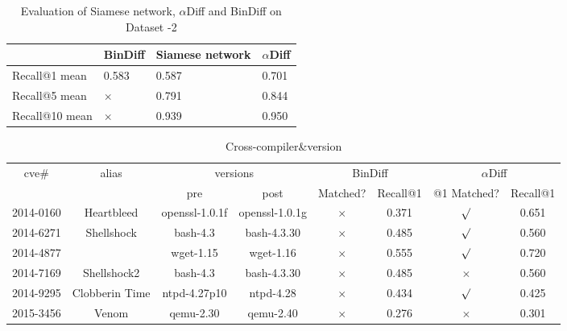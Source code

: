 \begin{table}[!t]
\newcommand{\tabincell}[2]{\begin{tabular}{@{}#1@{}}#2\end{tabular}}
\caption{Evaluation of Siamese network, $\alpha$Diff and BinDiff on Dataset \uppercase\expandafter{}-2}
\centering
\begin{tabular}{p{2cm}|p{1.8cm}|p{2cm}|p{1.3cm}}  
\hline  
\hline  
  & BinDiff & Siamese network & $\alpha$Diff \\
\hline
Recall@1 mean & 0.583 & 0.587 & 0.701 \\  
\hline  
Recall@5 mean & $\times$ & 0.791 & 0.844 \\ 
\hline
Recall@10 mean & $\times$ & 0.939 & 0.950 \\  
\hline  
\hline  
\end{tabular}  
\end{table}

\begin{table}[!t]
\newcommand{\tabincell}[2]{\begin{tabular}{@{}#1@{}}#2\end{tabular}}
\caption{Cross-compiler\&version}
\centering
\begin{tabular}{c|c|c|c|c|c|c|c}  %
\hline  
\hline
\multirow{2}{*}{cve\#} &
\multirow{2}{*}{alias} &
\multicolumn{2}{|c|}{versions} &
\multicolumn{2}{c|}{BinDiff} &
\multicolumn{2}{c}{$\alpha$Diff} \\
& & pre & post & Matched? & Recall@1 &@1 Matched?& Recall@1 \\
\hline
2014-0160 & Heartbleed & openssl-1.0.1f & openssl-1.0.1g & $\times$ & 0.371 & $\surd$ & 0.651 \\ 
\hline
2014-6271 & Shellshock & bash-4.3 & bash-4.3.30 & $\times$ & 0.485 & $\surd$ & 0.560 \\
\hline
2014-4877 & & wget-1.15 & wget-1.16 & $\times$ & 0.555 & $\surd$ & 0.720 \\
\hline
2014-7169 & Shellshock2 & bash-4.3 & bash-4.3.30 & $\times$ & 0.485 & $\times$ & 0.560 \\
\hline
2014-9295 & Clobberin Time & ntpd-4.27p10 & ntpd-4.28 & $\times$ & 0.434 & $\surd$ & 0.425 \\
\hline
2015-3456 & Venom & qemu-2.30 & qemu-2.40 & $\times$ & 0.276 & $\times$ & 0.301 \\
\hline  
\hline  
\end{tabular}  
\end{table}

